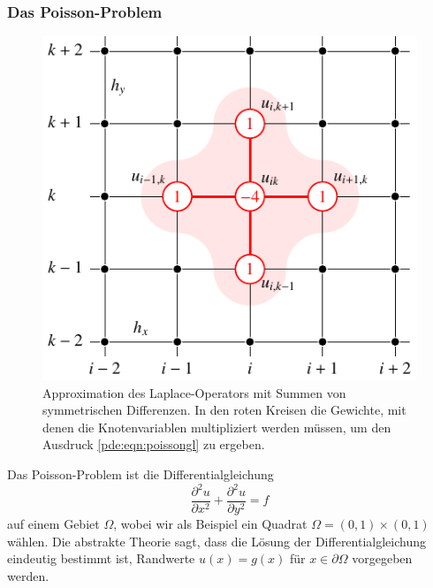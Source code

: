 \subsubsection{Das Poisson-Problem}
\begin{figure}
\centering
\includegraphics{chapters/70-pde/images/laplace.pdf}
\caption{Approximation des Laplace-Operators mit Summen von symmetrischen
Differenzen.
In den roten Kreisen die Gewichte, mit denen die Knotenvariablen 
multipliziert werden müssen, um den Ausdruck
\eqref{pde:eqn:poissongl} zu ergeben.
\label{buch:pde:laplace}}
\end{figure}
Das Poisson-Problem ist die Differentialgleichung
\begin{equation}
\frac{\partial^2 u}{\partial x^2}
+
\frac{\partial^2 u}{\partial y^2}
=
f
\label{buch:pde:poissondgl}
\end{equation}
auf einem Gebiet $\Omega$, wobei wir als Beispiel ein Quadrat
$\Omega = (0,1) \times (0,1)$ wählen.
Die abstrakte Theorie sagt, dass die Lösung der Differentialgleichung
eindeutig bestimmt ist, Randwerte $u(x)=g(x)$ für $x\in\partial\Omega$
vorgegeben werden.

